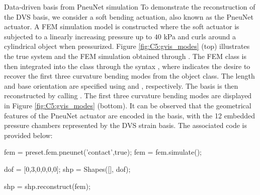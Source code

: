\begin{example}{Data-driven basis from PneuNet simulation}
To demonstrate the reconstruction of the DVS basis, we consider a soft bending actuation, also known as the PneuNet actuator. A FEM simulation model is constructed where the soft actuator is subjected to a linearly increasing pressure up to $40$ \si{\kilo \pascal} and curls around a cylindrical object when pressurized. Figure \ref{fig:C5:gvis_modes} (top) illustrates the true system and the FEM simulation obtained through . The FEM class is then integrated into the  class through the syntax , where  indicates the desire to recover the first three curvature bending modes from the  object class. The length and base orientation are specified using  and , respectively. The basis is then reconstructed by calling . The first three curvature bending modes are displayed in Figure \ref{fig:C5:gvis_modes} (bottom). It can be observed that the geometrical features of the PneuNet actuator are encoded in the basis, with the 12 embedded pressure chambers represented by the DVS strain basis. The associated code is provided below:
\end{example}
%
\begin{matlabcode}
fem = preset.fem.pneunet('contact',true);
fem = fem.simulate();

dof = [0,3,0,0,0,0];  %
shp = Shapes([], dof);

shp = shp.reconstruct(fem);
\end{matlabcode} 
% 
\\

